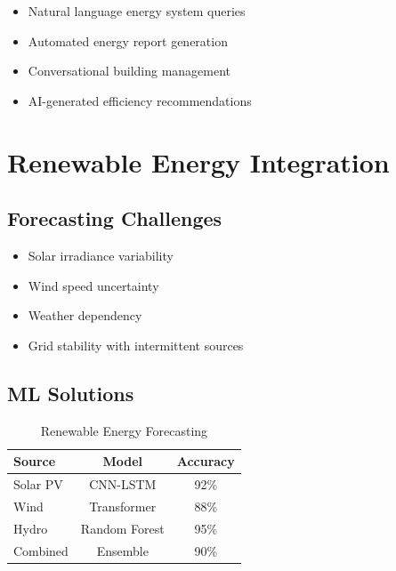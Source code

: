 \documentclass[12pt,a4paper]{article}
\begin{document}
\begin{itemize}
    \item Natural language energy system queries
    \item Automated energy report generation
    \item Conversational building management
    \item AI-generated efficiency recommendations
\end{itemize}

\section{Renewable Energy Integration}

\subsection{Forecasting Challenges}

\begin{itemize}
    \item Solar irradiance variability
    \item Wind speed uncertainty
    \item Weather dependency
    \item Grid stability with intermittent sources
\end{itemize}

\subsection{ML Solutions}

\begin{table}[H]
\centering
\caption{Renewable Energy Forecasting}
\begin{tabular}{lcc}
\toprule
\textbf{Source} & \textbf{Model} & \textbf{Accuracy} \\
\midrule
Solar PV & CNN-LSTM & 92\% \\
Wind & Transformer & 88\% \\
Hydro & Random Forest & 95\% \\
Combined & Ensemble & 90\% \\
\bottomrule
\end{tabular}
\end{table}

\end{document}

